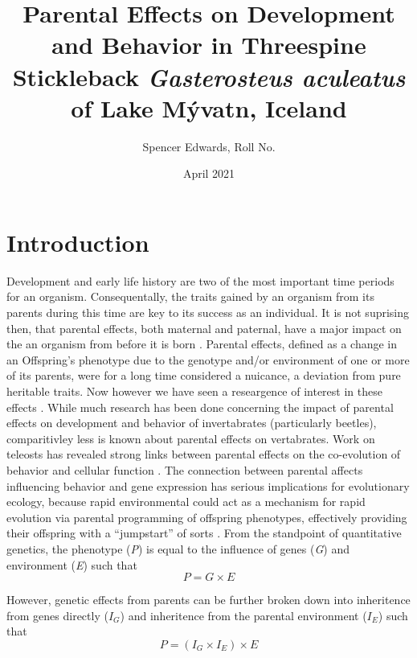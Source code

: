 \documentclass[12pt]{extarticle}
\title{Parental Effects on Development and Behavior in Threespine Stickleback \textit{Gasterosteus aculeatus} of Lake M\'yvatn, Iceland}
\author{Spencer Edwards, Roll No.}
\date{April 2021}
\begin{document}
\maketitle

\section*{Introduction}
Development and early life history are two of the most important time periods for an organism. Consequentally, the traits gained by an organism from its parents during this time are key to its success as an individual. It is not suprising then, that parental effects, both maternal and paternal, have a major impact on the an organism from before it is born \citep{charmantier_garant_kruuk_2014, Danchin2011, Badyaev2009}. Parental effects, defined as a change in an Offspring's phenotype due to the genotype and/or environment of one or more of its parents, were for a long time considered a nuicance, a deviation from pure heritable traits. Now however we have seen a researgence of interest in these effects \citep{charmantier_garant_kruuk_2014}. While much research has been done concerning the impact of parental effects on development \citep{Tigreros2021} and behavior of invertabrates (particularly beetles), comparitivley less is known about parental effects on vertabrates. Work on teleosts has revealed strong links between parental effects on the co-evolution of behavior and cellular function \citep{Yoshizawa2012}. The connection between parental affects influencing behavior and gene expression has serious implications for evolutionary ecology, because rapid environmental could act as a mechanism for rapid evolution via parental programming of offspring phenotypes, effectively providing their offspring with a ``jumpstart'' of sorts \citep{Danchin2011, Donelson2018}. 
From the standpoint of quantitative genetics, the phenotype (\textit{P}) is equal to the influence of genes (\textit{G}) and environment (\textit{E}) such that $$P = G \times E $$

However, genetic effects from parents can be further broken down into inheritence from genes directly ($I_G$) and inheritence from the parental environment ($I_E$) such that $$P = (I_G \times I_E) \times E$$
\end{document}
